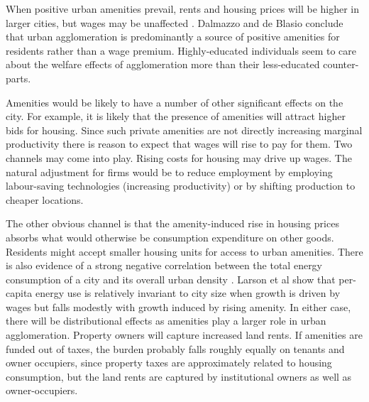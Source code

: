 When positive urban amenities prevail, rents and housing prices will be higher in larger cities, but wages may be unaffected \cite{robackWagesRentsAmenities1988, dalmazzoAmenitiesSkillbiasedAgglomeration2011}. Dalmazzo and  de Blasio\cite{dalmazzoAmenitiesSkillbiasedAgglomeration2011} conclude that urban agglomeration is predominantly a source of positive amenities for residents rather than a wage premium. Highly-educated individuals seem to care about the welfare effects of agglomeration more than their less-educated counter-parts. 


Amenities would be likely to have a number of other significant effects on the city. For example, it is likely that the presence of amenities will attract higher bids for housing. Since such private amenities are not directly increasing marginal productivity there is reason to expect that wages will rise to pay for them. Two channels may come into play. Rising costs for housing may drive up wages. The natural adjustment for firms would be to reduce employment by employing labour-saving technologies (increasing productivity) or by shifting production to cheaper locations.  

The other obvious channel is that the amenity-induced rise in housing prices absorbs what would otherwise be consumption expenditure on other goods. Residents might accept smaller housing units for access to urban amenities. There is also evidence of a strong negative correlation between the total energy consumption of a city and its overall urban density \cite{NewmanPeterJeffrey}. Larson et al show that per-capita energy use is relatively invariant to city size when growth is driven by wages but falls modestly with growth induced by rising amenity. 
In either case, there will be distributional effects as amenities play a larger role in urban agglomeration. Property owners will capture increased land rents. If amenities are funded out of taxes, the burden probably falls roughly equally on tenants and owner occupiers, since property taxes are approximately related to housing consumption, but the land rents are captured by institutional owners as well as owner-occupiers.

